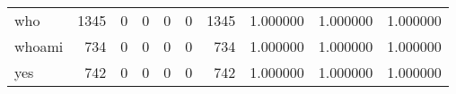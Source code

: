 \begin{longtable}{lrrrrrrrrr}
who       &                                               1345 &                                                  0 &                                                  0 &                                                  0 &                                                  0 &                                               1345 &                                           1.000000 &                               1.000000 &                             1.000000 \\
whoami    &                                                734 &                                                  0 &                                                  0 &                                                  0 &                                                  0 &                                                734 &                                           1.000000 &                               1.000000 &                             1.000000 \\
yes       &                                                742 &                                                  0 &                                                  0 &                                                  0 &                                                  0 &                                                742 &                                           1.000000 &                               1.000000 &                             1.000000 \\
\end{longtable}
